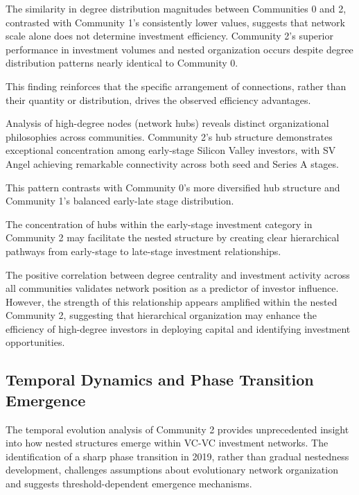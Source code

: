 The similarity in degree distribution magnitudes between Communities 0 and 2, contrasted with Community 1's consistently lower values, suggests that network scale alone does not determine investment efficiency. Community 2's superior performance in investment volumes and nested organization occurs despite degree distribution patterns nearly identical to Community 0. 

This finding reinforces that the specific arrangement of connections, rather than their quantity or distribution, drives the observed efficiency advantages.

Analysis of high-degree nodes (network hubs) reveals distinct organizational philosophies across communities. Community 2's hub structure demonstrates exceptional concentration among early-stage Silicon Valley investors, with SV Angel achieving remarkable connectivity across both seed and Series A stages. 

This pattern contrasts with Community 0's more diversified hub structure and Community 1's balanced early-late stage distribution. 

The concentration of hubs within the early-stage investment category in Community 2 may facilitate the nested structure by creating clear hierarchical pathways from early-stage to late-stage investment relationships.

The positive correlation between degree centrality and investment activity across all communities validates network position as a predictor of investor influence. However, the strength of this relationship appears amplified within the nested Community 2, suggesting that hierarchical organization may enhance the efficiency of high-degree investors in deploying capital and identifying investment opportunities.

\subsection{Temporal Dynamics and Phase Transition Emergence}


The temporal evolution analysis of Community 2 provides unprecedented insight into how nested structures emerge within VC-VC investment networks. The identification of a sharp phase transition in 2019, rather than gradual nestedness development, challenges assumptions about evolutionary network organization and suggests threshold-dependent emergence mechanisms.

